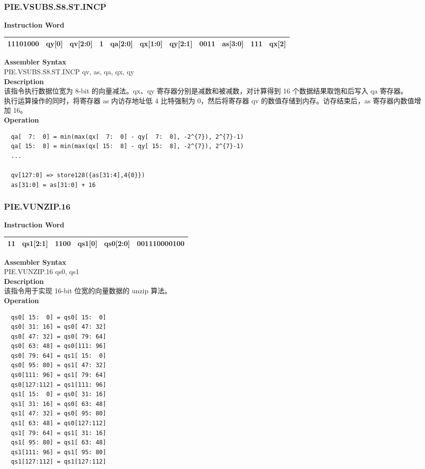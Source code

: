 \newpage
\subsubsection{PIE.VSUBS.S8.ST.INCP}\label{instruction:PIEVSUBSS8STINCP}
\setlength\tabcolsep{6pt}
\textbf{Instruction Word} \\
\begin{tabular}{|c|c|c|c|c|c|c|c|c|c|c|}
	\hline
	11101000 & qy[0] & qv[2:0] & 1 & qa[2:0] & qx[1:0] & qy[2:1] & 0011 & as[3:0] & 111 & qx[2] \\
	\hline
\end{tabular}

\textbf{Assembler Syntax} \\
PIE.VSUBS.S8.ST.INCP qv, as, qa, qx, qy \\
\textbf{Description} \\
该指令执行数据位宽为 8-bit 的向量减法。qx、qy 寄存器分别是减数和被减数，对计算得到 16 个数据结果取饱和后写入 qa 寄存器。\\ 执行运算操作的同时，将寄存器 as 内访存地址低 4 比特强制为 0，然后将寄存器 qv 的数值存储到内存。访存结束后，as 寄存器内数值增加 16。\\
\textbf{Operation}
\begin{lstlisting}
  qa[  7:  0] = min(max(qx[  7:  0] - qy[  7:  0], -2^{7}), 2^{7}-1)
  qa[ 15:  8] = min(max(qx[ 15:  8] - qy[ 15:  8], -2^{7}), 2^{7}-1)
  ...

  qv[127:0] => store128({as[31:4],4{0}})
  as[31:0] = as[31:0] + 16
\end{lstlisting}

\newpage
\subsubsection{PIE.VUNZIP.16}\label{instruction:PIEVUNZIP16}
\setlength\tabcolsep{6pt}
\textbf{Instruction Word} \\
\begin{tabular}{|c|c|c|c|c|c|}
	\hline
	11 & qs1[2:1] & 1100 & qs1[0] & qs0[2:0] & 001110000100 \\
	\hline
\end{tabular}

\textbf{Assembler Syntax} \\
PIE.VUNZIP.16 qs0, qs1 \\
\textbf{Description} \\
该指令用于实现 16-bit 位宽的向量数据的 unzip 算法。\\
\textbf{Operation}
\begin{lstlisting}
  qs0[ 15:  0] = qs0[ 15:  0]
  qs0[ 31: 16] = qs0[ 47: 32]
  qs0[ 47: 32] = qs0[ 79: 64]
  qs0[ 63: 48] = qs0[111: 96]
  qs0[ 79: 64] = qs1[ 15:  0]
  qs0[ 95: 80] = qs1[ 47: 32]
  qs0[111: 96] = qs1[ 79: 64]
  qs0[127:112] = qs1[111: 96]
  qs1[ 15:  0] = qs0[ 31: 16]
  qs1[ 31: 16] = qs0[ 63: 48]
  qs1[ 47: 32] = qs0[ 95: 80]
  qs1[ 63: 48] = qs0[127:112]
  qs1[ 79: 64] = qs1[ 31: 16]
  qs1[ 95: 80] = qs1[ 63: 48]
  qs1[111: 96] = qs1[ 95: 80]
  qs1[127:112] = qs1[127:112]
\end{lstlisting}

